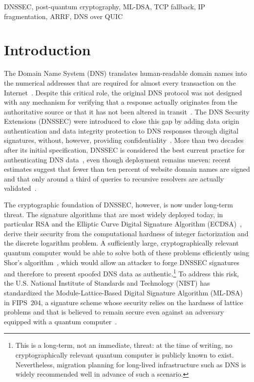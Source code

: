 \documentclass[conference]{IEEEtran}
\begin{document}
\begin{IEEEkeywords}
DNSSEC, post-quantum cryptography, ML-DSA, TCP fallback, IP fragmentation,
ARRF, DNS over QUIC
\end{IEEEkeywords}

\section{Introduction}
\label{sec:intro}

The Domain Name System (DNS) translates human-readable domain names into the
numerical addresses that are required for almost every transaction on the
Internet~\cite{rfc1035}. Despite this critical role, the original DNS protocol
was not designed with any mechanism for verifying that a response actually
originates from the authoritative source or that it has not been altered in
transit~\cite{rfc4033}. The DNS Security Extensions (DNSSEC) were introduced to
close this gap by adding data origin authentication and data integrity
protection to DNS responses through digital signatures, without, however,
providing confidentiality~\cite{rfc4033,rfc4034,rfc4035}. More than two decades
after its initial specification, DNSSEC is considered the best current practice
for authenticating DNS data~\cite{rfc9364}, even though deployment remains
uneven: recent estimates suggest that fewer than ten percent of website domain
names are signed and that only around a third of queries to recursive resolvers
are actually validated~\cite{rfc9364}.

The cryptographic foundation of DNSSEC, however, is now under long-term threat.
The signature algorithms that are most widely deployed today, in particular RSA
and the Elliptic Curve Digital Signature Algorithm
(ECDSA)~\cite{rfc6605,rfc8624}, derive their security from the computational
hardness of integer factorization and the discrete logarithm problem. A
sufficiently large, cryptographically relevant quantum computer would be able
to solve both of these problems efficiently using Shor's
algorithm~\cite{shor}, which would allow an attacker to forge DNSSEC signatures
and therefore to present spoofed DNS data as authentic.\footnote{This is a
long-term, not an immediate, threat: at the time of writing, no
cryptographically relevant quantum computer is publicly known to exist.
Nevertheless, migration planning for long-lived infrastructure such as DNS is
widely recommended well in advance of such a scenario.} To address this risk,
the U.S. National Institute of Standards and Technology (NIST) has standardized
the Module-Lattice-Based Digital Signature Algorithm (ML-DSA) in FIPS~204, a
signature scheme whose security relies on the hardness of lattice problems and
that is believed to remain secure even against an adversary equipped with a
quantum computer~\cite{fips204}.
\end{document}
